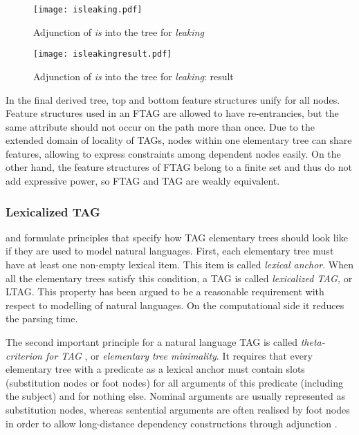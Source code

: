 \begin{figure}
	\centering
    \texttt{[image: isleaking.pdf]}
    \caption{Adjunction of \textit{is} into the tree for \textit{leaking}     \label{fig:isleaking}}
\end{figure}

\begin{figure}
	\centering
    \texttt{[image: isleakingresult.pdf]}
    \caption{Adjunction of \textit{is} into the tree for \textit{leaking}: result \label{fig:isleakingresult}}
\end{figure}

In the final derived tree, top and bottom feature structures unify for all nodes. Feature structures used in an FTAG are allowed to have re-entrancies, but the same attribute should not occur on the path more than once. Due to the extended domain of locality of TAGs, nodes within one elementary tree can share features, allowing to express constraints among dependent nodes easily. On the other hand, the feature structures of FTAG belong to a finite set and thus do not add expressive power, so FTAG and TAG are weakly equivalent.


\subsubsection{Lexicalized TAG} 
\citet{Abeille:02} and \cite{Frank:02} formulate principles that specify how TAG elementary trees should look like if they are used to model natural languages. First, each elementary tree must have at least one non-empty lexical item. This item is called \textit{lexical anchor}. When all the elementary trees satisfy this condition, a TAG is called \textit{lexicalized TAG,} or LTAG. This property has been argued to be a reasonable requirement with respect to modelling of natural languages. On the computational side it reduces the parsing time. 

The second important principle for a natural language TAG is called \textit{theta-criterion for TAG} \citep{Frank:92}, or \textit{elementary tree minimality}. It requires that every elementary tree with a predicate as a lexical anchor must contain slots (substitution nodes or foot nodes) for all arguments of this predicate (including the subject) and for nothing else. Nominal arguments are usually represented as substitution nodes, whereas sentential arguments are often realised by foot nodes in order to allow long-distance dependency constructions through adjunction  \citep{Kroch:89, Frank:02}.

